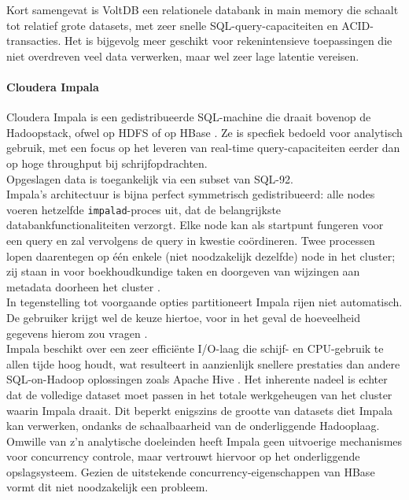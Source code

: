 Kort samengevat is VoltDB een relationele databank in main memory die schaalt tot relatief grote datasets, met zeer snelle SQL-query-capaciteiten en ACID-transacties. Het is bijgevolg meer geschikt voor rekenintensieve toepassingen die niet overdreven veel data verwerken, maar wel zeer lage latentie vereisen.

\paragraph{Cloudera Impala}

Cloudera Impala is een gedistribueerde SQL-machine die draait bovenop de Hadoopstack, ofwel op HDFS of op HBase \cite{cloudera_impala}. Ze is specfiek bedoeld voor analytisch gebruik, met een focus op het leveren van real-time query-capaciteiten eerder dan op hoge throughput bij schrijfopdrachten.\\
Opgeslagen data is toegankelijk via een subset van SQL-92.\\
Impala's architectuur is bijna perfect symmetrisch gedistribueerd: alle nodes voeren hetzelfde \texttt{impalad}-proces uit, dat de belangrijkste databankfunctionaliteiten verzorgt. Elke node kan als startpunt fungeren voor een query en zal vervolgens de query in kwestie co\"ordineren. Twee processen lopen daarentegen op \'e\'en enkele (niet noodzakelijk dezelfde) node in het cluster; zij staan in voor boekhoudkundige taken en doorgeven van wijzingen aan metadata doorheen het cluster \cite{impala_components}.\\
In tegenstelling tot voorgaande opties partitioneert Impala rijen niet automatisch. De gebruiker krijgt wel de keuze hiertoe, voor in het geval de hoeveelheid gegevens hierom zou vragen \cite{impala_partitioning}.\\
Impala beschikt over een zeer effici\"ente I/O-laag die schijf- en CPU-gebruik te allen tijde hoog houdt, wat resulteert in aanzienlijk snellere prestaties dan andere SQL-on-Hadoop oplossingen zoals Apache Hive \cite{floratou2014sql}. Het inherente nadeel is echter dat de volledige dataset moet passen in het totale werkgeheugen van het cluster waarin Impala draait. Dit beperkt enigszins de grootte van datasets diet Impala kan verwerken, ondanks de schaalbaarheid van de onderliggende Hadooplaag.\\
Omwille van z'n analytische doeleinden heeft Impala geen uitvoerige mechanismes voor concurrency controle, maar vertrouwt hiervoor op het onderliggende opslagsysteem. Gezien de uitstekende concurrency-eigenschappen van HBase vormt dit niet noodzakelijk een probleem.